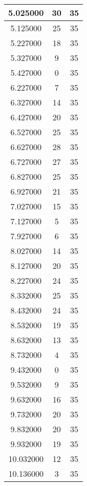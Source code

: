 \begin{longtable}[htbp]{|c|c|c|}
5.025000 & 30 & 35 \\ \hline
5.125000 & 25 & 35 \\ \hline
5.227000 & 18 & 35 \\ \hline
5.327000 & 9 & 35 \\ \hline
5.427000 & 0 & 35 \\ \hline
6.227000 & 7 & 35 \\ \hline
6.327000 & 14 & 35 \\ \hline
6.427000 & 20 & 35 \\ \hline
6.527000 & 25 & 35 \\ \hline
6.627000 & 28 & 35 \\ \hline
6.727000 & 27 & 35 \\ \hline
6.827000 & 25 & 35 \\ \hline
6.927000 & 21 & 35 \\ \hline
7.027000 & 15 & 35 \\ \hline
7.127000 & 5 & 35 \\ \hline
7.927000 & 6 & 35 \\ \hline
8.027000 & 14 & 35 \\ \hline
8.127000 & 20 & 35 \\ \hline
8.227000 & 24 & 35 \\ \hline
8.332000 & 25 & 35 \\ \hline
8.432000 & 24 & 35 \\ \hline
8.532000 & 19 & 35 \\ \hline
8.632000 & 13 & 35 \\ \hline
8.732000 & 4 & 35 \\ \hline
9.432000 & 0 & 35 \\ \hline
9.532000 & 9 & 35 \\ \hline
9.632000 & 16 & 35 \\ \hline
9.732000 & 20 & 35 \\ \hline
9.832000 & 20 & 35 \\ \hline
9.932000 & 19 & 35 \\ \hline
10.032000 & 12 & 35 \\ \hline
10.136000 & 3 & 35 \\ \hline
\end{longtable}
